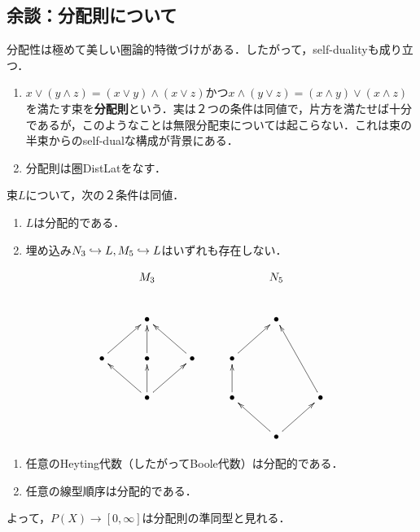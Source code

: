 \documentclass[uplatex, dvipdfmx]{jsreport}
\begin{document}
\subsection{余談：分配則について}

\begin{tcolorbox}[colframe=ForestGreen, colback=ForestGreen!10!white,breakable,colbacktitle=ForestGreen!40!white,coltitle=black,fonttitle=\bfseries\sffamily,
title=]
    分配性は極めて美しい圏論的特徴づけがある．したがって，self-dualityも成り立つ．
\end{tcolorbox}

\begin{definition}\mbox{}
    \begin{enumerate}
        \item $x\lor(y\land z)=(x\lor y)\land(x\lor z)$かつ$x\land(y\lor z)=(x\land y)\lor(x\land z)$を満たす束を\textbf{分配則}という．実は２つの条件は同値で，片方を満たせば十分であるが，このようなことは無限分配束については起こらない．これは束の半束からのself-dualな構成が背景にある．
        \item 分配則は圏DistLatをなす．
    \end{enumerate}
\end{definition}

\begin{theorem}
    束$L$について，次の２条件は同値．
    \begin{enumerate}
        \item $L$は分配的である．
        \item 埋め込み$N_3\hookrightarrow L,M_5\hookrightarrow L$はいずれも存在しない．
    \end{enumerate}
    \[\xymatrix{
        &M_3&&&N_5\\
        &\bullet&&&\bullet\\
        \bullet\ar[ur]&\bullet\ar[u]&\bullet\ar[ul]&\bullet\ar[ur]\\
        &\bullet\ar[ur]\ar[u]\ar[ul]&&\bullet\ar[u]&&\bullet\ar[uul]\\
        &&&&\bullet\ar[ur]\ar[ul]
    }\]
\end{theorem}

\begin{example}\mbox{}
    \begin{enumerate}
        \item 任意のHeyting代数（したがってBoole代数）は分配的である．
        \item 任意の線型順序は分配的である．
    \end{enumerate}
    よって，$P(X)\to[0,\infty]$は分配則の準同型と見れる．
\end{example}
\end{document}
